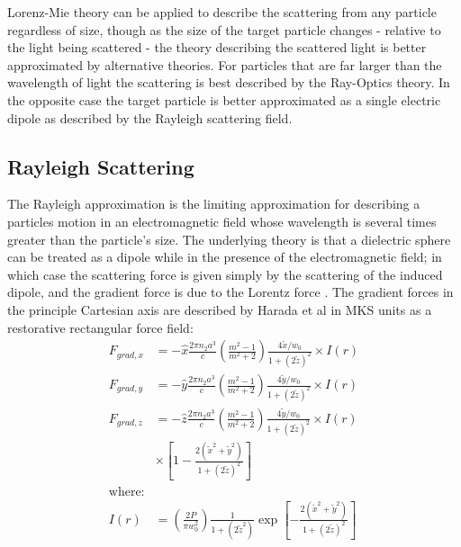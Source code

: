 Lorenz-Mie theory can be applied to describe the scattering from any 
particle regardless of size, though as the size of the target particle 
changes - relative to the light being scattered - the theory describing
the scattered light is better approximated by alternative theories. For 
particles that are far larger than the wavelength of light the scattering
is best described by the Ray-Optics theory. In the opposite case the 
target particle is better approximated as a single electric dipole as 
described by the Rayleigh scattering field.  

\subsection{Rayleigh Scattering}

The Rayleigh approximation is the limiting approximation for describing 
a particles motion in an electromagnetic field whose wavelength is several 
times greater than the particle's size. The underlying theory is that a 
dielectric sphere can be treated as a dipole while in the presence of the 
electromagnetic field; in which case the scattering force is given simply 
by the scattering of the induced dipole, and the gradient force is due 
to the Lorentz force \cite{Gordon1973}. The gradient forces in the 
principle Cartesian axis are described by Harada et al \cite{YasuhiroHarada1996} 
in MKS units as a restorative rectangular force field:
\begin{align}
  F_{grad,x}
  &=-\hat{x} \frac{2\pi n_2 a^3}{c}
    \left(\frac{m^2-1}{m^2+2}\right) \frac{4\tilde{x}/w_0}{1+(2\tilde{z})^2} \times I(r)
  \\
  F_{grad,y}
  &=-\hat{y} \frac{2\pi n_2 a^3}{c}
    \left(\frac{m^2-1}{m^2+2}\right) \frac{4\tilde{y}/w_0}{1+(2\tilde{z})^2} \times I(r)
  \\
  F_{grad,z}
  &=-\hat{z} \frac{2\pi n_2 a^3}{c}
    \left(\frac{m^2-1}{m^2+2}\right) \frac{4\tilde{y}/w_0}{1+(2\tilde{z})^2}
    \nonumber \times I(r)
  \\ 
  & \times \left[1-\frac{2(\tilde{x}^2+\tilde{y}^2)}{1+(2\tilde{z})^2} \right]
  \\
  \text{where:}
  \nonumber
  \\
	I(r) &= \left(\frac{2P}{\pi w_0^2}\right) \frac{1}{1+(2\tilde{z}^2)} 
	\exp \left[ - \frac{2(\tilde{x}^2+\tilde{y}^2)}{1+(2\tilde{z})^2} \right]
\end{align}

